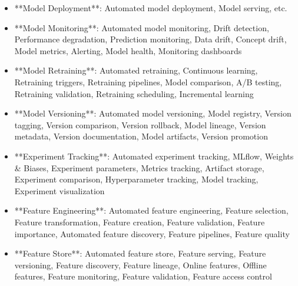 \documentclass[11pt,a4paper]{article}
\begin{document}
\begin{itemize}
\item **Model Deployment**: Automated model deployment, Model serving, etc.
\end{itemize}

\begin{itemize}
\item **Model Monitoring**: Automated model monitoring, Drift detection, Performance degradation, Prediction monitoring, Data drift, Concept drift, Model metrics, Alerting, Model health, Monitoring dashboards
\end{itemize}

\begin{itemize}
\item **Model Retraining**: Automated retraining, Continuous learning, Retraining triggers, Retraining pipelines, Model comparison, A/B testing, Retraining validation, Retraining scheduling, Incremental learning
\end{itemize}

\begin{itemize}
\item **Model Versioning**: Automated model versioning, Model registry, Version tagging, Version comparison, Version rollback, Model lineage, Version metadata, Version documentation, Model artifacts, Version promotion
\end{itemize}

\begin{itemize}
\item **Experiment Tracking**: Automated experiment tracking, MLflow, Weights & Biases, Experiment parameters, Metrics tracking, Artifact storage, Experiment comparison, Hyperparameter tracking, Model tracking, Experiment visualization
\end{itemize}

\begin{itemize}
\item **Feature Engineering**: Automated feature engineering, Feature selection, Feature transformation, Feature creation, Feature validation, Feature importance, Automated feature discovery, Feature pipelines, Feature quality
\end{itemize}

\begin{itemize}
\item **Feature Store**: Automated feature store, Feature serving, Feature versioning, Feature discovery, Feature lineage, Online features, Offline features, Feature monitoring, Feature validation, Feature access control
\end{itemize}
\end{document}
